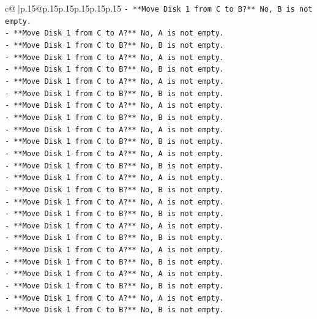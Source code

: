 \documentclass{article}
\begin{document}
{\begin{supertabular}{c@{$\;$}|p{.15\linewidth}@{}p{.15\linewidth}p{.15\linewidth}p{.15\linewidth}p{.15\linewidth}p{.15\linewidth}}
{{{\texttt{{-} **Move Disk 1 from C to B?** No, B is not empty.} \\
\texttt{{-} **Move Disk 1 from C to A?** No, A is not empty.} \\
\texttt{{-} **Move Disk 1 from C to B?** No, B is not empty.} \\
\texttt{{-} **Move Disk 1 from C to A?** No, A is not empty.} \\
\texttt{{-} **Move Disk 1 from C to B?** No, B is not empty.} \\
\texttt{{-} **Move Disk 1 from C to A?** No, A is not empty.} \\
\texttt{{-} **Move Disk 1 from C to B?** No, B is not empty.} \\
\texttt{{-} **Move Disk 1 from C to A?** No, A is not empty.} \\
\texttt{{-} **Move Disk 1 from C to B?** No, B is not empty.} \\
\texttt{{-} **Move Disk 1 from C to A?** No, A is not empty.} \\
\texttt{{-} **Move Disk 1 from C to B?** No, B is not empty.} \\
\texttt{{-} **Move Disk 1 from C to A?** No, A is not empty.} \\
\texttt{{-} **Move Disk 1 from C to B?** No, B is not empty.} \\
\texttt{{-} **Move Disk 1 from C to A?** No, A is not empty.} \\
\texttt{{-} **Move Disk 1 from C to B?** No, B is not empty.} \\
\texttt{{-} **Move Disk 1 from C to A?** No, A is not empty.} \\
\texttt{{-} **Move Disk 1 from C to B?** No, B is not empty.} \\
\texttt{{-} **Move Disk 1 from C to A?** No, A is not empty.} \\
\texttt{{-} **Move Disk 1 from C to B?** No, B is not empty.} \\
\texttt{{-} **Move Disk 1 from C to A?** No, A is not empty.} \\
\texttt{{-} **Move Disk 1 from C to B?** No, B is not empty.} \\
\texttt{{-} **Move Disk 1 from C to A?** No, A is not empty.} \\
\texttt{{-} **Move Disk 1 from C to B?** No, B is not empty.} \\
\texttt{{-} **Move Disk 1 from C to A?** No, A is not empty.} \\
\texttt{{-} **Move Disk 1 from C to B?** No, B is not empty.} \\
}}}
\end{supertabular}}
\end{document}
